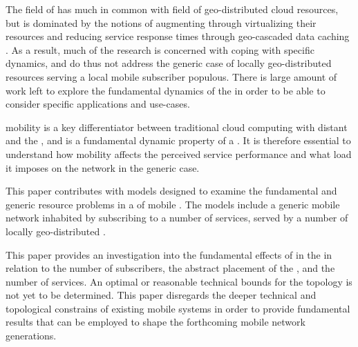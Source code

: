 The field of \xcloud{} has much in common with field of geo-distributed cloud resources, but is dominated by the notions of augmenting \ues{} through virtualizing their resources \cite{6563280} and reducing service response times through geo-cascaded data caching \cite{1437087,ericsson_akami}. As a result, much of the research is concerned with coping with specific dynamics, and do thus not address the generic case of locally geo-distributed resources serving a local mobile subscriber populous. There is large amount of work left to explore the fundamental dynamics of the \xcloud{} in order to be able to consider specific applications and use-cases.

\Ue{} mobility is a key differentiator between traditional cloud computing with distant \dcs{} and the \xcloud{}, and is a fundamental dynamic property of a \xcloud{}. It is therefore essential to understand how \ue{} mobility affects the perceived service performance and what load it imposes on the network in the generic case.

This paper contributes with models designed to examine the fundamental and generic resource problems in a \xcloud{} of mobile \ues{}. The models include a generic mobile network inhabited by \ues{} subscribing to a number of services, served by a number of locally geo-distributed \dcs{}.

This paper provides an investigation into the fundamental effects of \ue{} in the \xcloud{} in relation to the number of subscribers, the abstract placement of the \dc{}, and the number of services. An optimal or reasonable technical bounds for the \xcloud{} topology is not yet to be determined. This paper disregards the deeper technical and topological constrains of existing mobile systems in order to provide fundamental results that can be employed to shape the forthcoming mobile network generations.